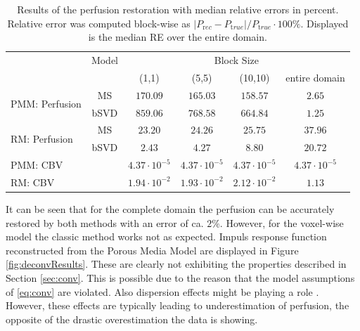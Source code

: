 \documentclass[paper=a4, fontsize=11pt,parskip=half,headings=small]{scrartcl}
\begin{document}
	\begin{table}[H]
		\caption{Results of the perfusion restoration with median relative errors in percent. Relative error was computed block-wise as $\vert P_{\mathrm rec} - P_{\mathrm true}\vert / P_{\mathrm true}\cdot 100\%$. Displayed is the median RE over the entire domain.}
		\centering
		\begin{tabular}{l c c c c c }
			& Model & \multicolumn{4}{c}{Block Size}\\
			 					 			& 		& (1,1) 	& (5,5)		& (10,10)	& entire domain \\
			\toprule
			\multirow{2}{*}{PMM: Perfusion} & MS 	& $170.09$ 	& $165.03$ 	& $158.57$	& $2.65$ \\
			 					 	   		& bSVD  & $859.06$ 	& $768.58$ 	& $664.84$	& $1.25$ \\
			\multirow{2}{*}{RM: Perfusion} & MS 	& $23.20$ 	& $24.26$ 	& $25.75$ 	& $37.96$ \\
			 					 			& bSVD  & $2.43$ 	& $4.27$ 	& $8.80$ 	& $20.72$ \\
			\midrule											
			PMM: CBV & & $4.37\cdot10^{-5}$      & $4.37\cdot10^{-5}$		& $4.37\cdot10^{-5}$		& $4.37\cdot10^{-5}$ \\											
			RM:  CBV & & $1.94\cdot10^{-2}$      & $1.93\cdot10^{-2}$		& $2.12\cdot10^{-2}$		& $1.13$ 			
		\end{tabular}
		\label{tab:resultsSim}
	\end{table}
	
	
	It can be seen that for the complete domain the perfusion can be accurately restored by both methods with an error of ca. $2\%$.
	However, for the voxel-wise model the classic method works not as expected.
	Impuls response function reconstructed from the Porous Media Model are displayed in Figure \ref{fig:deconvResults}.
	These are clearly not exhibiting the properties described in Section \ref{sec:conv}.
	This is possible due to the reason that the model assumptions of \eqref{eq:conv} are violated.
	Also dispersion effects might be playing a role \cite{calamante03}. 
	However, these effects are typically leading to underestimation of perfusion, the opposite of the drastic overestimation the data is showing.	
\end{document}
